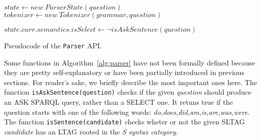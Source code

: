 \begin{algorithm}[t]

 {
	$state \leftarrow new\; ParserState(question)$ \\
	$tokenizer \leftarrow new\; Tokenizer(grammar,question)$ \\
	

	

	$state.curr.semantics.isSelect \leftarrow \neg isAskSentence(question)$ \\
	
}
\caption{Pseudocode of the \texttt{Parser} API.}
\label{alg:parser}
\end{algorithm}

Some functions in Algorithm~\ref{alg:parser} have not been formally defined because they are pretty self-explanatory or have been partially introduced in previous sections.
%
For reader's sake, we briefly describe the most important ones here.
%
The function \texttt{isAskSentence(question)} checks if the given \textit{question} should produce an ASK SPARQL query, rather than a SELECT one. It retuns true if the question starts with one of the following words: \textit{do,does,did,am,is,are,was,were}.
%
The function \texttt{isSentence(candidate)} checks wheter or not the given SLTAG \textit{candidate} has an LTAG rooted in the \textit{S syntax category}.


